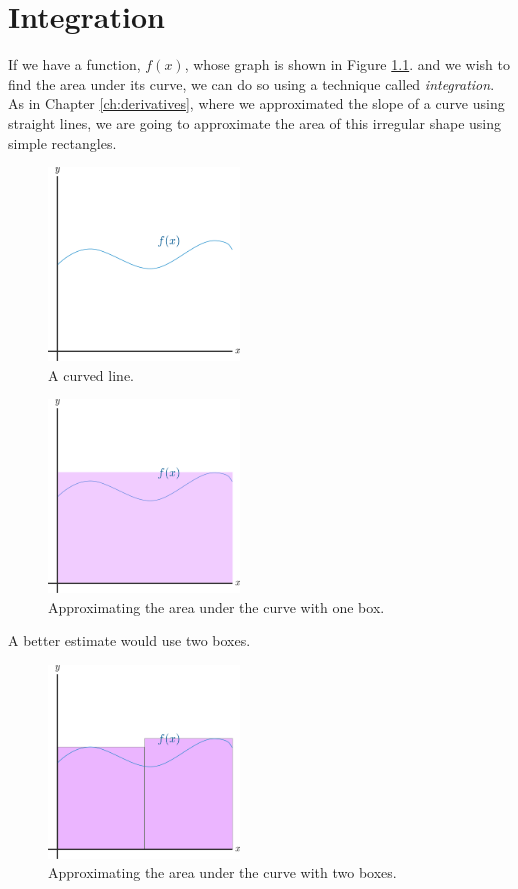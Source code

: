 \chapter{Integration}
If we have a function, $f(x)$, whose graph is shown in Figure \ref{fig:curve}.
and we wish to find the area under its curve, we can do so using a technique called \emph{integration}.
As in Chapter \ref{ch:derivatives}, where we approximated the slope of a curve using straight lines,
we are going to approximate the area of this irregular shape using simple rectangles.
\setlength{\parindent}{0pt}
\begin{figure}[H]
  \begin{center}
    \includegraphics[width=2in]{continuous/integration/rei1}
  \end{center}
  \caption{A curved line.}
  \label{fig:curve}
\end{figure}
\begin{figure}[H]
  \begin{center}
    \includegraphics[width=2in]{continuous/integration/rei2}
  \end{center}
  \caption{Approximating the area under the curve with one box.}
\end{figure}
A better estimate would use two boxes.
\begin{figure}[H]
  \begin{center}
    \includegraphics[width=2in]{continuous/integration/rei3}
  \end{center}
  \caption{Approximating the area under the curve with two boxes.}
\end{figure}
